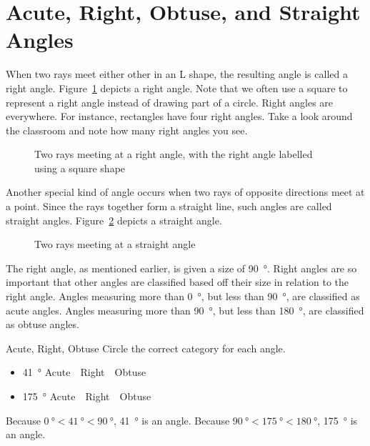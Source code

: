 \documentclass[a4paper,10pt]{report}
\begin{document}
\section{Acute, Right, Obtuse, and Straight Angles}

When two rays meet either other in an L shape, the resulting angle is called a
\gls{right angle}. Figure~\ref{an:tworaysright} depicts a right angle. Note that
we often use a square to represent a right angle instead of drawing part of a
circle. Right angles are everywhere. For instance, rectangles have four right
angles. Take a look around the classroom and note how many right angles you see.

\begin{figure}
 \fgTwoRaysRight{}

 \caption{Two rays meeting at a right angle, with the right angle labelled using
 a square shape}
 \label{an:tworaysright}
\end{figure}

Another special kind of angle occurs when two rays of opposite directions meet
at a point. Since the rays together form a straight line, such angles are called
\glspl{straight angle}. Figure~\ref{an:tworaysstraight} depicts a straight
angle.

\begin{figure}

 \caption{Two rays meeting at a straight angle}
 \label{an:tworaysstraight}
\end{figure}

The right angle, as mentioned earlier, is given a size of \SI{90}{\degree}.
Right angles are so important that other angles are classified based off their
size in relation to the right angle. Angles measuring more than \SI{0}{\degree},
but less than \SI{90}{\degree}, are classified as \glspl{acute angle}. Angles
measuring more than \SI{90}{\degree}, but less than \SI{180}{\degree}, are
classified as \glspl{obtuse angle}.

\begin{problem}{Acute, Right, Obtuse}
 Circle the correct category for each angle.

 \begin{itemize}
  \item \SI{41}{\degree} \hfill Acute~~Right~~Obtuse
  \item \SI{175}{\degree} \hfill Acute~~Right~~Obtuse
 \end{itemize}

 \begin{solution}
  Because $\SI{0}{\degree} < \SI{41}{\degree} < \SI{90}{\degree}$,
  \SI{41}{\degree} is an  angle. Because $\SI{90}{\degree} <
  \SI{175}{\degree} < \SI{180}{\degree}$, \SI{175}{\degree} is an 
  angle.
 \end{solution}
\end{problem}
\end{document}
